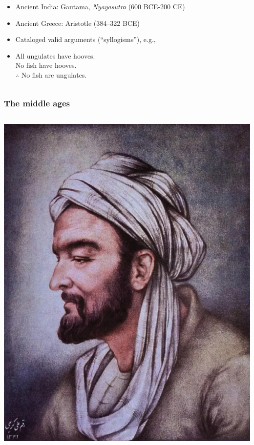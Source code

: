 \begin{frame}
\begin{columns}
\begin{column}{.5\textwidth}
\begin{itemize}[<+->]
        \item Ancient India: Gautama, \emph{Nyayasutra} (600 BCE-200
        CE)
        \item Ancient Greece: Aristotle (384--322 BCE)
        \item Cataloged valid arguments (``syllogisms''), e.g.,
        \item All ungulates have hooves.\\
        No fish have hooves.\\
        $\therefore$ No fish are ungulates.
      \end{itemize}
    \end{column}
  \end{columns}
\end{frame}

\begin{frame}
  \frametitle{The middle ages}
  \begin{columns}
    \begin{column}{.5\textwidth}
    \includegraphics[height=.8\textheight]{../assets/avicenna}

\end{column}
\end{columns}
\end{frame}
